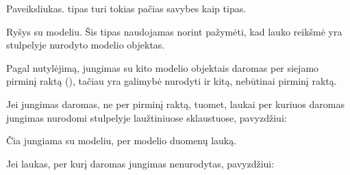 \documentclass[letterpaper,10pt,lithuanian]{sphinxmanual}
\begin{document}

\begin{fulllineitems}
\label{\detokenize{tipai:type.image}}
\pysigstartsignatures
{}
\pysigstopsignatures
\sphinxAtStartPar
Paveiksliukas.  tipas turi tokias pačias savybes kaip 
tipas.

\end{fulllineitems}


\begin{fulllineitems}
\label{\detokenize{tipai:type.ref}}
\pysigstartsignatures
{}
\pysigstopsignatures
\sphinxAtStartPar
Ryšys su modeliu. Šis tipas naudojamas norint pažymėti, kad lauko
reikšmė yra {\hyperref[\detokenize{dimensijos:property.ref}]{}} stulpelyje nurodyto modelio objektas.

\sphinxAtStartPar
Pagal nutylėjimą, jungimas su kito modelio objektais daromas per siejamo
pirminį raktą ({\hyperref[\detokenize{dimensijos:model.ref}]{}}), tačiau yra galimybė nurodyti ir kitą,
nebūtinai pirminį raktą.

\sphinxAtStartPar
Jei jungimas daromas, ne per pirminį raktą, tuomet, laukai per kuriuos
daromas jungimas nurodomi {\hyperref[\detokenize{dimensijos:property.ref}]{}} stulpelyje laužtiniuose
sklaustuose, pavyzdžiui:

\begin{sphinxVerbatim}[commandchars=\\\{\}]
\PYG{p}{[}\PYG{p}{]}
\end{sphinxVerbatim}

\sphinxAtStartPar
Čia jungiama su  modeliu, per  modelio  duomenų
lauką.

\sphinxAtStartPar
Jei laukas, per kurį daromas jungimas nenurodytas, pavyzdžiui:

\begin{sphinxVerbatim}[commandchars=\\\{\}]
\end{sphinxVerbatim}


\end{fulllineitems}
\end{document}
